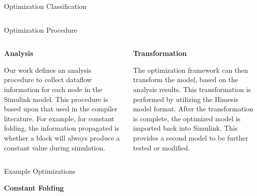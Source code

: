 \documentclass[final,hyperref={pdfpagelabels=false}]{beamer}
\begin{document}
\begin{frame}{}
\begin{block}{Optimization Classification}
\begin{columns}[t]
                  \end{columns}
            \end{block}
	
        \begin{block}{Optimization Procedure}
        \vspace{-1.5cm}
        \begin{columns}[t]
         \begin{column}{.485\linewidth}
         \vspace{-.8cm}
       \begin{center}\textbf{Analysis}\end{center}
       \footnotesize
       Our work defines an analysis procedure to collect dataflow information for each node in the Simulink model. This procedure is based upon that used in the compiler literature. For example, for constant folding, the information propagated is whether a block will always produce a constant value during simulation.
       \end{column}
       \begin{column}{.485\linewidth}
       \vspace{-.8cm}
      \begin{center}\textbf{Transformation}\end{center}
        \footnotesize
        The optimization framework can then transform the model, based on the analysis results. This transformation is performed by utilizing the Himesis model format. After the transformation is complete, the optimized model is imported back into Simulink. This provides a second model to be further tested or modified.
        \end{column}
              \end{columns}
        \end{block}
      
      \vspace{-1.5cm}
    \begin{columns}[t]
    \centering
      \begin{column}{.585\linewidth}
        \begin{block}{Example Optimizations}
         \vspace{-.8cm}
        \small
        \begin{center}\textbf{Constant Folding}\end{center}
        
        \begin{columns}[c]
        \begin{column}{.485\linewidth}
        \begin{center}
        

\end{center}
\end{column}
\end{columns}
\end{block}
\end{column}
\end{columns}
\end{frame}
\end{document}
